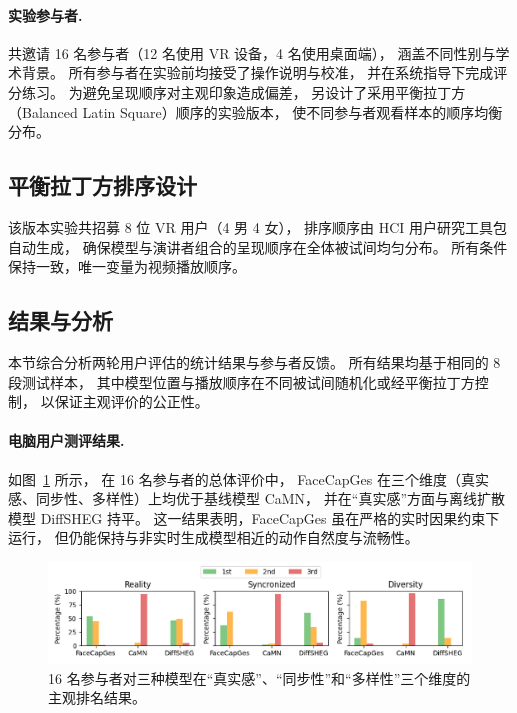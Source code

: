 \paragraph{实验参与者.}
共邀请 16 名参与者（12 名使用 VR 设备，4 名使用桌面端），
涵盖不同性别与学术背景。
所有参与者在实验前均接受了操作说明与校准，
并在系统指导下完成评分练习。
为避免呈现顺序对主观印象造成偏差，
另设计了采用平衡拉丁方（Balanced Latin Square）顺序的实验版本，
使不同参与者观看样本的顺序均衡分布。

\subsection{平衡拉丁方排序设计}
\label{subsec:latin_square}

该版本实验共招募 8 位 VR 用户（4 男 4 女），
排序顺序由 HCI 用户研究工具包 \cite{LatinSquareToolkit} 自动生成，
确保模型与演讲者组合的呈现顺序在全体被试间均匀分布。
所有条件保持一致，唯一变量为视频播放顺序。

\subsection{结果与分析}
\label{subsec:user_study_result}

本节综合分析两轮用户评估的统计结果与参与者反馈。
所有结果均基于相同的 8 段测试样本，
其中模型位置与播放顺序在不同被试间随机化或经平衡拉丁方控制，
以保证主观评价的公正性。

\paragraph{电脑用户测评结果.}
如图~\ref{fig:userstudy} 所示，
在 16 名参与者的总体评价中，
FaceCapGes 在三个维度（真实感、同步性、多样性）上均优于基线模型 CaMN，
并在“真实感”方面与离线扩散模型 DiffSHEG 持平。
这一结果表明，FaceCapGes 虽在严格的实时因果约束下运行，
但仍能保持与非实时生成模型相近的动作自然度与流畅性。

\begin{figure}[h!t]
\centering
\includegraphics[width=\linewidth]{figures/UserStudy_All.png}
\caption{16 名参与者对三种模型在“真实感”、“同步性”和“多样性”三个维度的主观排名结果。}
\label{fig:userstudy}
\end{figure}

